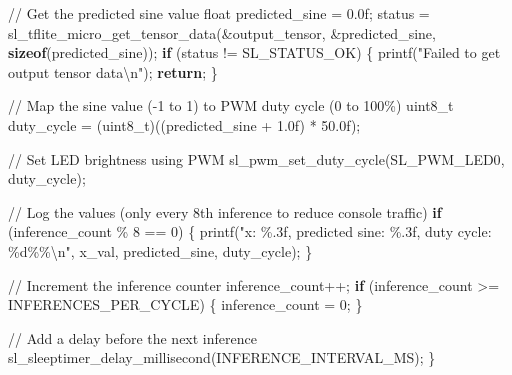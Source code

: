 \documentclass[
  9pt,
  letterpaper,
  abstract,
  titlepage]{scrbook}
\newenvironment{Shaded}{\begin{snugshade}}{\end{snugshade}}
\newcommand{\BuiltInTok}[1]{\textcolor[rgb]{0.00,0.23,0.31}{#1}}
\newcommand{\CommentTok}[1]{\textcolor[rgb]{0.37,0.37,0.37}{#1}}
\newcommand{\ControlFlowTok}[1]{\textcolor[rgb]{0.00,0.23,0.31}{\textbf{#1}}}
\newcommand{\DataTypeTok}[1]{\textcolor[rgb]{0.68,0.00,0.00}{#1}}
\newcommand{\DecValTok}[1]{\textcolor[rgb]{0.68,0.00,0.00}{#1}}
\newcommand{\FloatTok}[1]{\textcolor[rgb]{0.68,0.00,0.00}{#1}}
\newcommand{\KeywordTok}[1]{\textcolor[rgb]{0.00,0.23,0.31}{\textbf{#1}}}
\newcommand{\NormalTok}[1]{\textcolor[rgb]{0.00,0.23,0.31}{#1}}
\newcommand{\OperatorTok}[1]{\textcolor[rgb]{0.37,0.37,0.37}{#1}}
\newcommand{\SpecialCharTok}[1]{\textcolor[rgb]{0.37,0.37,0.37}{#1}}
\newcommand{\StringTok}[1]{\textcolor[rgb]{0.13,0.47,0.30}{#1}}
\begin{document}
\begin{Shaded}
\begin{Highlighting}[]
  \CommentTok{// Get the predicted sine value}
  \DataTypeTok{float}\NormalTok{ predicted\_sine }\OperatorTok{=} \FloatTok{0.0}\BuiltInTok{f}\OperatorTok{;}
\NormalTok{  status }\OperatorTok{=}\NormalTok{ sl\_tflite\_micro\_get\_tensor\_data}\OperatorTok{(\&}\NormalTok{output\_tensor}\OperatorTok{,} \OperatorTok{\&}\NormalTok{predicted\_sine}\OperatorTok{,} \KeywordTok{sizeof}\OperatorTok{(}\NormalTok{predicted\_sine}\OperatorTok{));}
  \ControlFlowTok{if} \OperatorTok{(}\NormalTok{status }\OperatorTok{!=}\NormalTok{ SL\_STATUS\_OK}\OperatorTok{)} \OperatorTok{\{}
\NormalTok{    printf}\OperatorTok{(}\StringTok{"Failed to get output tensor data}\SpecialCharTok{\textbackslash{}n}\StringTok{"}\OperatorTok{);}
    \ControlFlowTok{return}\OperatorTok{;}
  \OperatorTok{\}}
  
  \CommentTok{// Map the sine value ({-}1 to 1) to PWM duty cycle (0 to 100\%)}
  \DataTypeTok{uint8\_t}\NormalTok{ duty\_cycle }\OperatorTok{=} \OperatorTok{(}\DataTypeTok{uint8\_t}\OperatorTok{)((}\NormalTok{predicted\_sine }\OperatorTok{+} \FloatTok{1.0}\BuiltInTok{f}\OperatorTok{)} \OperatorTok{*} \FloatTok{50.0}\BuiltInTok{f}\OperatorTok{);}
  
  \CommentTok{// Set LED brightness using PWM}
\NormalTok{  sl\_pwm\_set\_duty\_cycle}\OperatorTok{(}\NormalTok{SL\_PWM\_LED0}\OperatorTok{,}\NormalTok{ duty\_cycle}\OperatorTok{);}
  
  \CommentTok{// Log the values (only every 8th inference to reduce console traffic)}
  \ControlFlowTok{if} \OperatorTok{(}\NormalTok{inference\_count }\OperatorTok{\%} \DecValTok{8} \OperatorTok{==} \DecValTok{0}\OperatorTok{)} \OperatorTok{\{}
\NormalTok{    printf}\OperatorTok{(}\StringTok{"x: }\SpecialCharTok{\%.3f}\StringTok{, predicted sine: }\SpecialCharTok{\%.3f}\StringTok{, duty cycle: }\SpecialCharTok{\%d\%\%\textbackslash{}n}\StringTok{"}\OperatorTok{,} 
\NormalTok{           x\_val}\OperatorTok{,}\NormalTok{ predicted\_sine}\OperatorTok{,}\NormalTok{ duty\_cycle}\OperatorTok{);}
  \OperatorTok{\}}
  
  \CommentTok{// Increment the inference counter}
\NormalTok{  inference\_count}\OperatorTok{++;}
  \ControlFlowTok{if} \OperatorTok{(}\NormalTok{inference\_count }\OperatorTok{\textgreater{}=}\NormalTok{ INFERENCES\_PER\_CYCLE}\OperatorTok{)} \OperatorTok{\{}
\NormalTok{    inference\_count }\OperatorTok{=} \DecValTok{0}\OperatorTok{;}
  \OperatorTok{\}}
  
  \CommentTok{// Add a delay before the next inference}
\NormalTok{  sl\_sleeptimer\_delay\_millisecond}\OperatorTok{(}\NormalTok{INFERENCE\_INTERVAL\_MS}\OperatorTok{);}
\OperatorTok{\}}
\end{Highlighting}
\end{Shaded}
\end{document}
